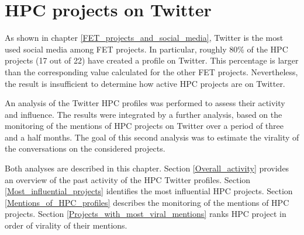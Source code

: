 \chapter{HPC projects on Twitter} \label{HPC_projects_on_Twitter}
As shown in chapter \ref{FET_projects_and_social_media}, Twitter is the most used social media among FET projects. In particular, roughly 80\% of the HPC projects (17 out of 22) have created a profile on Twitter. This percentage is larger than the corresponding value calculated for the other FET projects. Nevertheless, the result is insufficient to determine how active HPC projects are on Twitter. 

An analysis of the Twitter HPC profiles was performed to assess their activity and influence. The results were integrated by a further analysis, based on the monitoring of the mentions of HPC projects on Twitter over a period of three and a half months. The goal of this second analysis was to estimate the virality of the conversations on the considered projects.  

Both analyses are described in this chapter. Section \ref{Overall_activity} provides an overview of the past activity of the HPC Twitter profiles. Section \ref{Most_influential_projects} identifies the most influential HPC projects. Section \ref{Mentions_of_HPC_profiles} describes the monitoring of the mentions of HPC projects. Section \ref{Projects_with_most_viral_mentions} ranks HPC project in order of virality of their mentions. 


